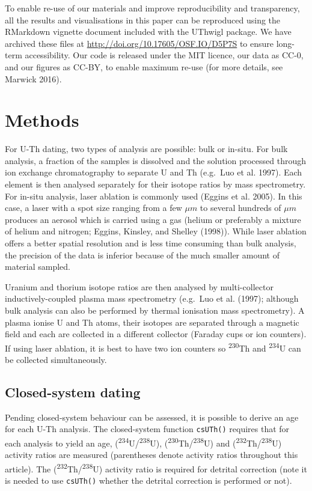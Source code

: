 \documentclass[]{elsarticle} %
\begin{document}
To enable re-use of our materials and improve reproducibility and transparency, all the results and visualisations in this paper can be reproduced using the RMarkdown vignette document included with the UThwigl package. We have archived these files at \url{http://doi.org/10.17605/OSF.IO/D5P7S} to ensure long-term accessibility. Our code is released under the MIT licence, our data as CC-0, and our figures as CC-BY, to enable maximum re-use (for more details, see Marwick 2016).

\hypertarget{methods}{%
\section{Methods}\label{methods}}

For U-Th dating, two types of analysis are possible: bulk or in-situ. For bulk analysis, a fraction of the samples is dissolved and the solution processed through ion exchange chromatography to separate U and Th (e.g.~Luo et al. 1997). Each element is then analysed separately for their isotope ratios by mass spectrometry.
For in-situ analysis, laser ablation is commonly used (Eggins et al. 2005). In this case, a laser with a spot size ranging from a few \(\mu m\) to several hundreds of \(\mu m\) produces an aerosol which is carried using a gas (helium or preferably a mixture of helium and nitrogen; Eggins, Kinsley, and Shelley (1998)).
While laser ablation offers a better spatial resolution and is less time consuming than bulk analysis, the precision of the data is inferior because of the much smaller amount of material sampled.

Uranium and thorium isotope ratios are then analysed by multi-collector inductively-coupled plasma mass spectrometry (e.g.~Luo et al. (1997); although bulk analysis can also be performed by thermal ionisation mass spectrometry). A plasma ionise U and Th atoms, their isotopes are separated through a magnetic field and each are collected in a different collector (Faraday cups or ion counters). If using laser ablation, it is best to have two ion counters so \textsuperscript{230}Th and \textsuperscript{234}U can be collected simultaneously.

\hypertarget{closed-system-dating}{%
\subsection{Closed-system dating}\label{closed-system-dating}}

Pending closed-system behaviour can be assessed, it is possible to derive an age for each U-Th analysis.
The closed-system function \texttt{csUTh()} requires that for each analysis to yield an age, (\textsuperscript{234}U/\textsuperscript{238}U), (\textsuperscript{230}Th/\textsuperscript{238}U) and (\textsuperscript{232}Th/\textsuperscript{238}U) activity ratios are measured (parentheses denote activity ratios throughout this article). The (\textsuperscript{232}Th/\textsuperscript{238}U) activity ratio is required for detrital correction (note it is needed to use \texttt{csUTh()} whether the detrital correction is performed or not).
\end{document}
